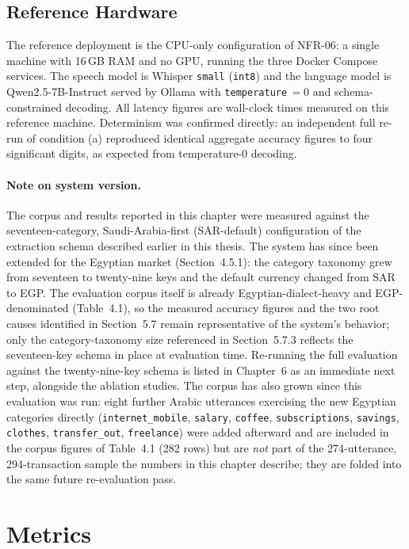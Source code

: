 \subsection{Reference Hardware}

The reference deployment is the CPU-only configuration of NFR-06: a single
machine with 16\,GB RAM and no GPU, running the three Docker Compose services.
The speech model is Whisper \texttt{small} (\texttt{int8}) and the language
model is Qwen2.5-7B-Instruct served by Ollama with \texttt{temperature}\,$=0$
and schema-constrained decoding. All latency figures are wall-clock times
measured on this reference machine. Determinism was confirmed directly: an
independent full re-run of condition (a) reproduced identical aggregate
accuracy figures to four significant digits, as expected from
temperature-0 decoding.

\paragraph{Note on system version.} The corpus and results reported in this
chapter were measured against the seventeen-category, Saudi-Arabia-first
(SAR-default) configuration of the extraction schema described earlier in
this thesis. The system has since been extended for the Egyptian market
(Section~4.5.1): the category taxonomy grew from seventeen to twenty-nine
keys and the default currency changed from SAR to EGP. The evaluation
corpus itself is already Egyptian-dialect-heavy and EGP-denominated (Table~4.1),
so the measured accuracy figures and the two root causes identified in
Section~5.7 remain representative of the system's behavior; only the
category-taxonomy size referenced in Section~5.7.3 reflects the
seventeen-key schema in place at evaluation time. Re-running the full
evaluation against the twenty-nine-key schema is listed in Chapter~6 as an
immediate next step, alongside the ablation studies. The corpus has also grown
since this evaluation was run: eight further Arabic utterances exercising the
new Egyptian categories directly (\texttt{internet\_mobile}, \texttt{salary},
\texttt{coffee}, \texttt{subscriptions}, \texttt{savings}, \texttt{clothes},
\texttt{transfer\_out}, \texttt{freelance}) were added afterward and are
included in the corpus figures of Table~4.1 (282 rows) but are \emph{not} part
of the 274-utterance, 294-transaction sample the numbers in this chapter
describe; they are folded into the same future re-evaluation pass.

\section{Metrics}

